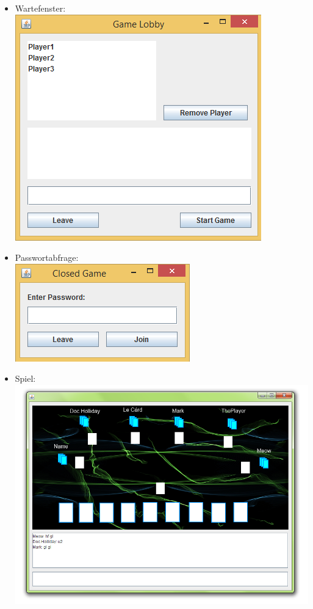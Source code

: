 \documentclass{article}
\begin{document}
\begin{itemize}
	\item \gls{Wartefenster}: \\ \includegraphics[scale=0.7]{GUI_images/GameLobby}
	\item Passwortabfrage: \\ \includegraphics{GUI_images/PasswordRequest}
	\item Spiel: \\ \includegraphics[scale=0.6]{GUI_images/GameClient}
\end{itemize}
\end{document}
